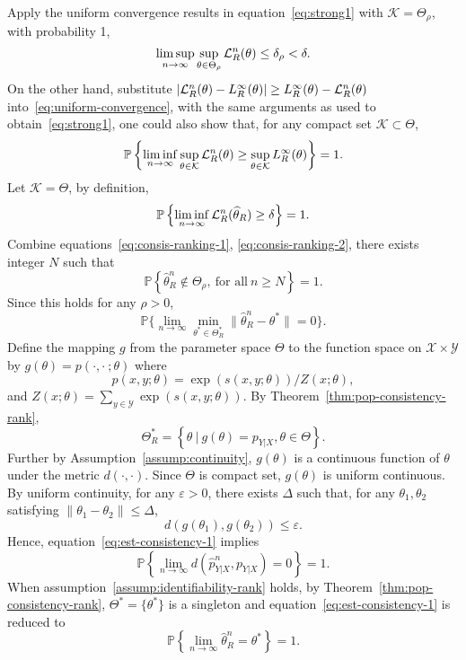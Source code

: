 \documentclass[11pt,a4paper]{article}
\newcommand{\wh}[1]{\widehat{#1}}
\newcommand{\objr}{{\cal L}_R^n}
\newcommand{\str}[3]{s(#1, #2; #3)}
\begin{document}
Apply the uniform convergence results in equation~\eqref{eq:strong1} with $\mathcal{K} = \Theta_{\rho}$, with probability 1, 
\begin{equation}
  \limsup\limits_{n\rightarrow\infty}\sup\limits_{\theta\in\Theta_{\rho}} \objr(\theta) \leq \delta_{\rho} < \delta. 
  \label{eq:consis-ranking-1}
\end{equation}
On the other hand, substitute $|\objr (\theta) - L_R^\infty(\theta)|\geq L_R^\infty(\theta) - \objr(\theta)$ into~\eqref{eq:uniform-convergence}, with the same arguments as used to obtain~\eqref{eq:strong1}, one could also show that, for any compact set $\mathcal{K}\subset \Theta$,
\[
    \mathbb{P} \left\{ 
    \liminf\limits_{n\rightarrow\infty} \sup\limits_{\theta\in\mathcal{K}} \objr (\theta)  \geq \sup \limits_{\theta\in\mathcal{K}} L_R^\infty(\theta)
    \right\} = 1.
\]
Let $\mathcal{K} = \Theta$, by definition, 
\begin{equation}
  \mathbb{P} \left\{ \liminf\limits_{n\rightarrow\infty} \objr(\wh{\theta}_R) \geq  \delta \right\} = 1.
    \label{eq:consis-ranking-2}
\end{equation}
Combine equations~\eqref{eq:consis-ranking-1}, \eqref{eq:consis-ranking-2}, there exists integer $N$ such that 
\[
    \mathbb{P} \left\{ \wh{\theta}_R^n \not\in \Theta_{\rho}, ~\text{for all}~ n\geq N\right\} = 1.
\]
Since this holds for any $\rho > 0$,  
\begin{equation}
  \mathbb{P} \Big\{\lim_{n\rightarrow \infty} \min_{\theta^*\in\Theta^*_R}\| \wh{\theta}_R^n - \theta^*\| = 0 \Big\}.
  \label{eq:est-consistency-1}
\end{equation}
Define the mapping $g$ from the parameter space $\Theta$ to the function space on $\mathcal{X}\times\mathcal{Y}$ by $g(\theta) = p(\cdot, \cdot~; \theta)$ where
\[
p(x, y; \theta) = \exp(\str{x}{y}{\theta})/Z(x; \theta),
\]
and $Z(x; \theta) = \sum_{y\in\mathcal{Y}}\exp(\str{x}{y}{\theta})$. 
By Theorem~\ref{thm:pop-consistency-rank}, 
\begin{equation}
  \Theta^*_R = \left\{\theta~|~ g(\theta) = p_{Y|X}, \theta\in\Theta\right\}.
  \label{eq:est-consistency-2}
\end{equation}
Further by Assumption~\ref{assump:continuity}, $g(\theta)$ is a continuous function of $\theta$ under the metric $d(\cdot, \cdot)$. Since $\Theta$ is compact set, $g(\theta)$ is uniform continuous. By uniform continuity, for any $\varepsilon > 0$, there exists $\Delta$ such that, for any $\theta_1, \theta_2$ satisfying $\|\theta_1 - \theta_2\|\leq \Delta$, 
\[
d \left(g(\theta_1), g(\theta_2)\right) \leq \varepsilon. 
\]
Hence, equation~\eqref{eq:est-consistency-1} implies
\[
    \mathbb{P} \left\{ \lim\limits_{n\rightarrow \infty} d \left(\wh{p}_{Y|X}^n, p_{Y|X}\right) = 0\right\} = 1. 
\]
When assumption~\ref{assump:identifiability-rank} holds, by Theorem~\ref{thm:pop-consistency-rank},  $\Theta^* = \{\theta^*\}$ is a singleton and equation~\eqref{eq:est-consistency-1} is reduced to
\[
    \mathbb{P} \left\{\lim\limits_{n\rightarrow \infty} \wh{\theta}_R^n = \theta^*\right\} = 1. 
\]
\end{document}
